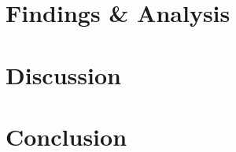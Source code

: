 \documentclass[12pt, a4paper]{article}
\begin{document}
\section{Findings \& Analysis}
%

\section{Discussion}
%

\section{Conclusion}
%


%



\end{document}
